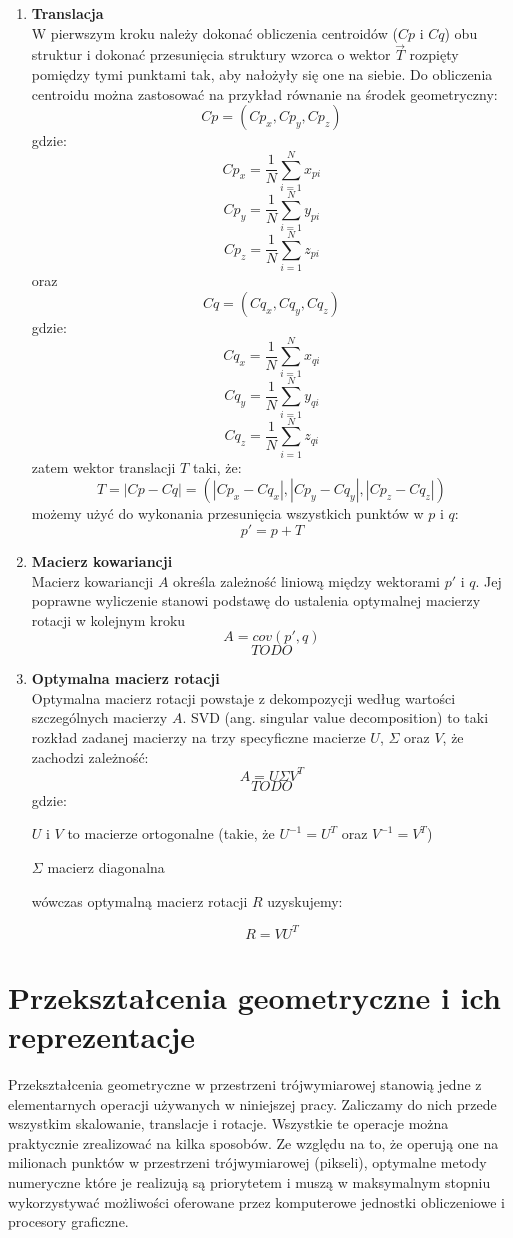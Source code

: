 \documentclass[licencjacka]{pracamgr}
\begin{document}
\begin{enumerate}
\item \textbf{Translacja} \\
W pierwszym kroku należy dokonać obliczenia centroidów ($Cp$ i $Cq$) obu struktur i dokonać przesunięcia struktury wzorca o wektor $\vec{T}$ rozpięty pomiędzy tymi punktami tak, aby nałożyły się one na siebie. Do obliczenia centroidu można zastosować na przykład równanie na środek geometryczny: 
$$Cp = (Cp_x, Cp_y, Cp_z)$$
gdzie:
$$Cp_x = \frac{1}{N}\sum_{i=1}^{N}{x_{pi}}$$
$$Cp_y = \frac{1}{N}\sum_{i=1}^{N}{y_{pi}}$$
$$Cp_z = \frac{1}{N}\sum_{i=1}^{N}{z_{pi}}$$
oraz
$$Cq = (Cq_x, Cq_y, Cq_z)$$
gdzie:
$$Cq_x = \frac{1}{N}\sum_{i=1}^{N}{x_{qi}}$$
$$Cq_y = \frac{1}{N}\sum_{i=1}^{N}{y_{qi}}$$
$$Cq_z = \frac{1}{N}\sum_{i=1}^{N}{z_{qi}}$$
zatem wektor translacji $T$ taki, że:
$$ T = |Cp-Cq| =(|Cp_x-Cq_x|,|Cp_y-Cq_y|,|Cp_z-Cq_z|)$$
możemy użyć do wykonania przesunięcia wszystkich punktów w $p$ i $q$:
$$p'=p+T$$
\item \textbf{Macierz kowariancji} \\
Macierz kowariancji $A$ określa zależność liniową między wektorami $p'$ i $q$. Jej poprawne wyliczenie stanowi podstawę do ustalenia optymalnej macierzy rotacji w kolejnym kroku
$$ 
A=cov(p',q)
$$
$$
 TODO
$$

\item \textbf{Optymalna macierz rotacji} \\
Optymalna macierz rotacji powstaje z dekompozycji według wartości szczególnych macierzy $A$. SVD (ang. singular value decomposition) to taki rozkład zadanej macierzy na trzy specyficzne macierze $U$, $\Sigma$ oraz $V$, że zachodzi zależność:
$$
A=U \Sigma V^T
$$
$$
 TODO
$$
gdzie:

\quad$U$ i $V$ to macierze ortogonalne (takie, że $U^{-1}=U^{T}$ oraz $V^{-1}=V^{T}$)

\quad$\Sigma$ macierz diagonalna

wówczas optymalną macierz rotacji $R$ uzyskujemy:

$$R=VU^T$$

\end{enumerate}

\section{Przekształcenia geometryczne i ich reprezentacje}
Przekształcenia geometryczne w przestrzeni trójwymiarowej stanowią jedne z elementarnych operacji używanych w niniejszej pracy. Zaliczamy do nich przede wszystkim skalowanie, translacje i rotacje. Wszystkie te operacje można praktycznie zrealizować na kilka sposobów. Ze względu na to, że operują one na milionach punktów w przestrzeni trójwymiarowej (pikseli), optymalne metody numeryczne które je realizują są priorytetem i muszą w maksymalnym stopniu wykorzystywać możliwości oferowane przez komputerowe jednostki obliczeniowe i procesory graficzne. 
\end{document}
